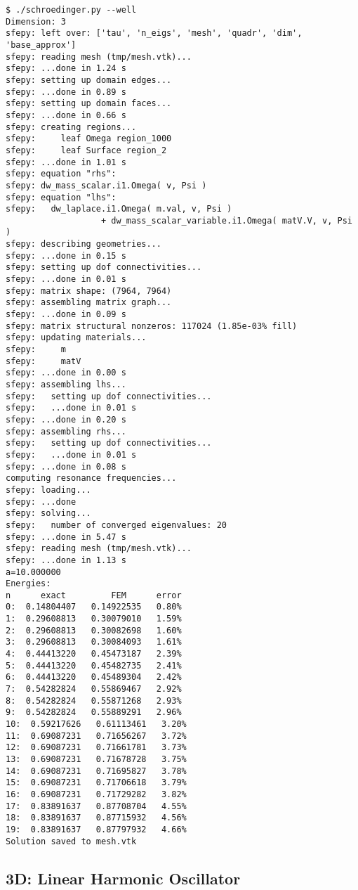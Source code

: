 \begin{lstlisting}
$ ./schroedinger.py --well
Dimension: 3
sfepy: left over: ['tau', 'n_eigs', 'mesh', 'quadr', 'dim', 'base_approx']
sfepy: reading mesh (tmp/mesh.vtk)...
sfepy: ...done in 1.24 s
sfepy: setting up domain edges...
sfepy: ...done in 0.89 s
sfepy: setting up domain faces...
sfepy: ...done in 0.66 s
sfepy: creating regions...
sfepy:     leaf Omega region_1000
sfepy:     leaf Surface region_2
sfepy: ...done in 1.01 s
sfepy: equation "rhs":
sfepy: dw_mass_scalar.i1.Omega( v, Psi )
sfepy: equation "lhs":
sfepy:   dw_laplace.i1.Omega( m.val, v, Psi )
                   + dw_mass_scalar_variable.i1.Omega( matV.V, v, Psi )
sfepy: describing geometries...
sfepy: ...done in 0.15 s
sfepy: setting up dof connectivities...
sfepy: ...done in 0.01 s
sfepy: matrix shape: (7964, 7964)
sfepy: assembling matrix graph...
sfepy: ...done in 0.09 s
sfepy: matrix structural nonzeros: 117024 (1.85e-03% fill)
sfepy: updating materials...
sfepy:     m
sfepy:     matV
sfepy: ...done in 0.00 s
sfepy: assembling lhs...
sfepy:   setting up dof connectivities...
sfepy:   ...done in 0.01 s
sfepy: ...done in 0.20 s
sfepy: assembling rhs...
sfepy:   setting up dof connectivities...
sfepy:   ...done in 0.01 s
sfepy: ...done in 0.08 s
computing resonance frequencies...
sfepy: loading...
sfepy: ...done
sfepy: solving...
sfepy:   number of converged eigenvalues: 20
sfepy: ...done in 5.47 s
sfepy: reading mesh (tmp/mesh.vtk)...
sfepy: ...done in 1.13 s
a=10.000000
Energies:
n      exact         FEM      error
0:  0.14804407   0.14922535   0.80%
1:  0.29608813   0.30079010   1.59%
2:  0.29608813   0.30082698   1.60%
3:  0.29608813   0.30084093   1.61%
4:  0.44413220   0.45473187   2.39%
5:  0.44413220   0.45482735   2.41%
6:  0.44413220   0.45489304   2.42%
7:  0.54282824   0.55869467   2.92%
8:  0.54282824   0.55871268   2.93%
9:  0.54282824   0.55889291   2.96%
10:  0.59217626   0.61113461   3.20%
11:  0.69087231   0.71656267   3.72%
12:  0.69087231   0.71661781   3.73%
13:  0.69087231   0.71678728   3.75%
14:  0.69087231   0.71695827   3.78%
15:  0.69087231   0.71706618   3.79%
16:  0.69087231   0.71729282   3.82%
17:  0.83891637   0.87708704   4.55%
18:  0.83891637   0.87715932   4.56%
19:  0.83891637   0.87797932   4.66%
Solution saved to mesh.vtk

\end{lstlisting}

\subsection{3D: Linear Harmonic Oscillator}

